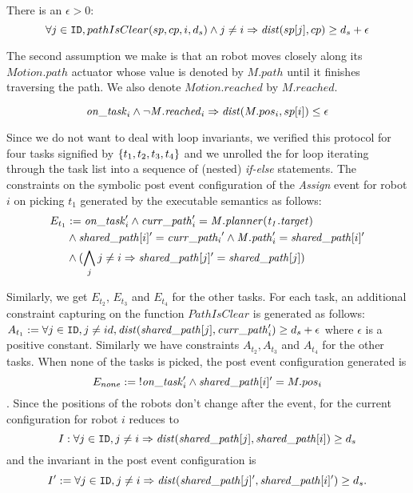 \begin{assumption}
    \label{pathclear} There is an $\epsilon > 0$:
    $$\forall j \in \texttt{ID}, pathIsClear(sp, cp,  i, d_s) \wedge j \neq i \Rightarrow  \mathit{dist}(sp[j], cp) \geq d_s + \epsilon$$
\end{assumption}


The second assumption we make is that an robot moves closely along its $\mathit{Motion.path}$ actuator whose value is denoted by $\mathit{M.path}$ until it finishes traversing the path. We also denote $\mathit{Motion.reached}$ by $\mathit{M.reached}$.
\begin{assumption}
        \label{stlinemotion}
    $$\mathit{on\_task}_i\wedge \neg \mathit{M.reached}_i \Rightarrow \mathit{dist}(M.pos_i, sp[i]) \leq \epsilon $$
\end{assumption}

Since we do not want to deal with loop invariants, we verified this protocol for four tasks signified by $\left\{t_1,t_2,t_3,t_4\right\}$ and we unrolled the for loop iterating through the task list into a sequence of (nested) \emph{if-else} statements. The constraints on the symbolic post event configuration of the \emph{Assign} event for robot $i$ on picking $t_1$ generated by the \K executable semantics as follows: \begin{align*}E_{t_1} &:= \mathit{on\_task}_i' \wedge \mathit{curr\_path}_i' = \mathit{M.planner(t_1.target)} \\ &\wedge \mathit{shared\_path}[i]' = \mathit{curr\_path_i}' \wedge \mathit{M.path}_i' = \mathit{shared\_path}[i]' \\
  &\wedge (\bigwedge_j j\neq i \Rightarrow \mathit{shared\_path}[j]'= \mathit{shared\_path}[j] )
 \end{align*}

Similarly, we get $E_{t_2}$, $E_{t_3}$ and $E_{t_4}$ for the other tasks. For each task, an additional constraint capturing  on the function $\mathit{PathIsClear}$ is generated as follows:  $A_{t_1} := \forall j \in \texttt{ID}, j \neq id, \mathit{dist}(\mathit{shared\_path}[j], \mathit{curr\_path}_i') \geq d_s + \epsilon$ where $\epsilon$ is a positive constant. Similarly we have constraints $A_{t_2}, A_{t_3}$  and $A_{t_4}$ for the other tasks. When none of the tasks is picked, the post event configuration generated is $$ E_{none} :=\mbox{!}\mathit{on\_task}_i' \wedge \mathit{shared\_path}[i]' = M.pos_i $$. Since the positions of the robots don't change after the event,  for the current configuration for robot $i$ reduces to $$I: \forall j \in \texttt{ID}, j \neq i \Rightarrow \mathit{dist}(\mathit{shared\_path}[j], \mathit{shared\_path}[i]) \geq d_s  $$ and the invariant in the post event configuration is $$I' := \forall j \in \texttt{ID}, j \neq i \Rightarrow \mathit{dist}(\mathit{shared\_path}[j]', \mathit{shared\_path}[i]') \geq d_s  .$$

